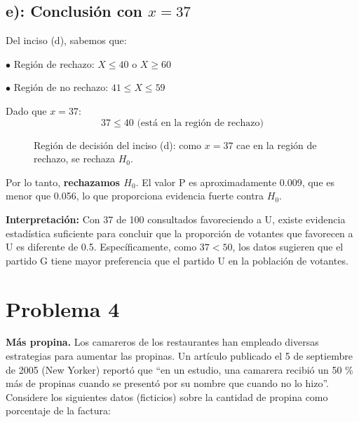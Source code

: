 \documentclass[12pt]{article}
\begin{document}
\subsection*{e): Conclusión con $x = 37$}

Del inciso (d), sabemos que:

$\bullet$ Región de rechazo: $X \leq 40$ o $X \geq 60$

$\bullet$ Región de no rechazo: $41 \leq X \leq 59$

Dado que $x = 37$:
$$37 \leq 40 \text{ (está en la región de rechazo)}$$

\begin{figure}[H]
\centering
{}
\caption{Región de decisión del inciso (d): como $x=37$ cae en la región de rechazo, se rechaza $H_0$.}
\end{figure}


Por lo tanto, \textbf{rechazamos $H_0$}. El valor P es aproximadamente 0.009, 
que es menor que 0.056, lo que proporciona evidencia fuerte contra $H_0$.

\textbf{Interpretación:} Con 37 de 100 consultados favoreciendo a U, existe evidencia estadística suficiente para concluir que la proporción de votantes que favorecen a U es diferente de 0.5. Específicamente, como $37 < 50$, los datos sugieren que el partido G tiene mayor preferencia que el partido U en la población de votantes.

\section*{Problema 4}

\textbf{Más propina.} Los camareros de los restaurantes han empleado diversas estrategias para aumentar las propinas. Un artículo publicado el 5 de septiembre de 2005 (New Yorker) reportó que ``en un estudio, una camarera recibió un 50 \% más de propinas cuando se presentó por su nombre que cuando no lo hizo''. Considere los siguientes datos (ficticios) sobre la cantidad de propina como porcentaje de la factura:
\end{document}
